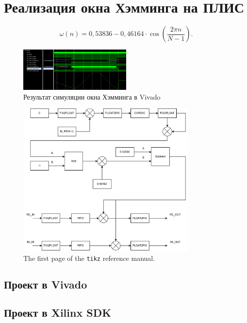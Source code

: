 \documentclass[a4paper,oneside ,14pt]{extreport}
\begin{document}
\section{Реализация окна Хэмминга на ПЛИС}

\begin{equation}	
	\omega(n) = 0,53836 - 0,46164 \cdot \cos(\frac{2 \pi n}{N-1}).
\end{equation}
	
\begin{figure}[h]
	\centering
	\includegraphics[width=0.5\textwidth]{image/win_ham.png}
	\caption{Результат симуляции окна Хэмминга в Vivado}
	\label{win_ham}
\end{figure}

\begin{figure}[htpb]
    \centering
    \includegraphics[width=0.8\textwidth]{ham.pdf}
    \caption{The first page of the \texttt{tikz} reference manual.}
    \label{fig:tikzpgf}
\end{figure}

\subsection{Проект в Vivado}

\subsection{Проект в Xilinx SDK}
\end{document}

